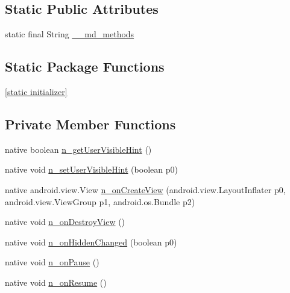 \subsection*{Static Public Attributes}
\begin{CompactItemize}
\item 
static final String \hyperlink{classmd5270abb39e60627f0f200893b490a1ade_1_1_fragment_container_5e152354be6320af362304f8c061ed9b}{\_\-\_\-md\_\-methods}
\end{CompactItemize}
\subsection*{Static Package Functions}
\begin{CompactItemize}
\item 
\hyperlink{classmd5270abb39e60627f0f200893b490a1ade_1_1_fragment_container_b5bc1e4a0a6335897682cdd46a7b845d}{\mbox{[}static initializer\mbox{]}}
\end{CompactItemize}
\subsection*{Private Member Functions}
\begin{CompactItemize}
\item 
native boolean \hyperlink{classmd5270abb39e60627f0f200893b490a1ade_1_1_fragment_container_7b29e98e286b30e0311c4875185dc88f}{n\_\-getUserVisibleHint} ()
\item 
native void \hyperlink{classmd5270abb39e60627f0f200893b490a1ade_1_1_fragment_container_be08304fec0177841d7102ecbd8465a0}{n\_\-setUserVisibleHint} (boolean p0)
\item 
native android.view.View \hyperlink{classmd5270abb39e60627f0f200893b490a1ade_1_1_fragment_container_4fb332bbe46a024be3eeba66bee4b879}{n\_\-onCreateView} (android.view.LayoutInflater p0, android.view.ViewGroup p1, android.os.Bundle p2)
\item 
native void \hyperlink{classmd5270abb39e60627f0f200893b490a1ade_1_1_fragment_container_dfb39eed167df4be40a54a70748757f4}{n\_\-onDestroyView} ()
\item 
native void \hyperlink{classmd5270abb39e60627f0f200893b490a1ade_1_1_fragment_container_97378e88350395d8acd4e03431aa0b92}{n\_\-onHiddenChanged} (boolean p0)
\item 
native void \hyperlink{classmd5270abb39e60627f0f200893b490a1ade_1_1_fragment_container_2777aa4c89a97aec65ba03ef4af5d64c}{n\_\-onPause} ()
\item 
native void \hyperlink{classmd5270abb39e60627f0f200893b490a1ade_1_1_fragment_container_3d52a8ab3b57ba5469da472e7eaa1ab1}{n\_\-onResume} ()
\end{CompactItemize}
